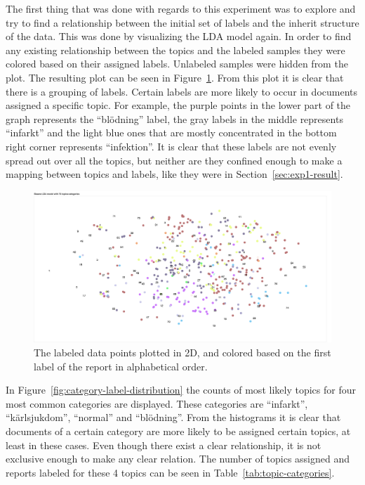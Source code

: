 The first thing that was done with regards to this experiment was to explore and try to find a relationship between the initial set of labels and the inherit structure of the data.
This was done by visualizing the LDA model again.
In order to find any existing relationship between the topics and the labeled samples they were colored based on their assigned labels.
Unlabeled samples were hidden from the plot.
The resulting plot can be seen in Figure~\ref{fig:categories-lda-75}.
From this plot it is clear that there is a grouping of labels.
Certain labels are more likely to occur in documents assigned a specific topic.
For example, the purple points in the lower part of the graph represents the ``blödning'' label, the gray labels in the middle represents ``infarkt'' and the light blue ones that are mostly concentrated in the bottom right corner represents ``infektion''.
It is clear that these labels are not evenly spread out over all the topics, but neither are they confined enough to make a mapping between topics and labels, like they were in Section~\ref{sec:exp1-result}.

\begin{figure}[h!]
    \centering
    \includegraphics[scale=0.2]{figures/categories-lda-75.png}
    \caption{The labeled data points plotted in 2D, and colored based on the first label of the report in alphabetical order.}
    \label{fig:categories-lda-75}
\end{figure}

In Figure~\ref{fig:category-label-distribution} the counts of most likely topics for four most common categories are displayed.
These categories are ``infarkt'', ``kärlsjukdom'', ``normal'' and ``blödning''.
From the histograms it is clear that documents of a certain category are more likely to be assigned certain topics, at least in these cases.
Even though there exist a clear relationship, it is not exclusive enough to make any clear relation.
The number of topics assigned and reports labeled for these 4 topics can be seen in Table~\ref{tab:topic-categories}.

